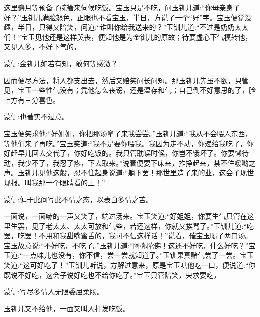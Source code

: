 \begin{parag}
    这里麝月等预备了碗箸来伺候吃饭。宝玉只是不吃，问玉钏儿道:“你母亲身子好？”玉钏儿满脸怒色，正眼也不看宝玉，半日，方说了一个“好”字。宝玉便觉没趣，半日，只得又陪笑，问道:“谁叫你给我送来的？”玉钏儿道:“不过是奶奶太太们！”宝玉见他还是这样哭丧，便知他是为金钏儿的原故；待要虚心下气模转他，又见人多，不好下气的，\begin{note}蒙侧:金钏儿如若有知，敢何等感激？\end{note}因而便尽方法，将人都支出去，然后又赔笑问长问短。那玉钏儿先虽不欲，只管见，宝玉一些性气没有；凭他怎么丧谤，还是温存和气；自己倒不好意思的了，脸上方有三分喜色。\begin{note}蒙侧:也著实不过意。\end{note}宝玉便笑求他:“好姐姐，你把那汤拿了来我尝尝。”玉钏儿道:“我从不会喂人东西，等他们来了再吃。”宝玉笑道:“我不是要你喂我。我因为走不动，你递给我吃了，你好赶早儿回去交代了，你好吃饭的。我只管耽误时候，你岂不饿坏了。你要懒待动，我少不了，我忍了疼，下去取来。”说着便要下床来，拃挣起来，禁不住嗳哟之声。玉钏儿见他这般，忍不住起身说道:“躺下罢！那世里造了来的业，这会子现世现报。叫我那一个眼睛看的上！”\begin{note}蒙侧:偏于此间写此不情之态，以表白多情之苦。\end{note}一面说，一面哧的一声又笑了，端过汤来。宝玉笑道:“好姐姐，你要生气只管在这里生罢，见了老太太、太太可放和气些，若还这样，你就又挨骂了。”玉钏儿道:“吃罢，吃罢！不用和我甜嘴蜜舌的，我可不信这样话！”说着，催宝玉喝了两口汤。宝玉故意说:“不好吃，不吃了。”玉钏儿道:“阿弥陀佛！这还不好吃，什么好吃？”宝玉道:“一点味儿也没有，你不信，尝一尝就知道了。”玉钏果真赌气尝了一尝。宝玉笑道:“这可好吃了！”玉钏儿听说，方解过意来，原是宝玉哄他吃一口，便说道:“你既说不好吃，这会子说好吃也不给你吃了。”宝玉只管陪笑，央求要吃，\begin{note}蒙侧:写尽多情人无限委屈柔肠。\end{note}玉钏儿又不给他，一面又叫人打发吃饭。
\end{parag}


